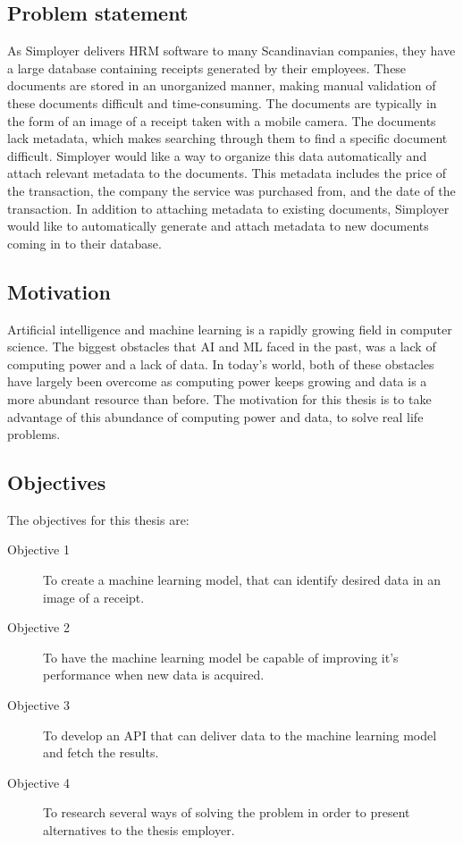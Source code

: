 \subsection{Problem statement}\label{subsec:problem-statement}
As Simployer delivers HRM software to many Scandinavian companies, they have a large database containing receipts
generated by their employees.
These documents are stored in an unorganized manner, making manual validation of these documents difficult and time-consuming.
The documents are typically in the form of an image of a receipt taken with a mobile camera.
The documents lack metadata, which makes searching through them to find a specific document difficult.
Simployer would like a way to organize this data automatically and attach relevant metadata to the documents.
This metadata includes the price of the transaction, the company the service was purchased from, and the date of the transaction.
In addition to attaching metadata to existing documents, Simployer would like to automatically generate and attach metadata to new documents coming in to their database.

\subsection{Motivation}\label{subsec:motivation}
Artificial intelligence and machine learning is a rapidly growing field in computer science.
The biggest obstacles that AI and ML faced in the past, was a lack of computing power and a lack of data.
In today's world, both of these obstacles have largely been overcome as computing power keeps growing and data is a
more abundant resource than before.
The motivation for this thesis is to take advantage of this abundance of computing power and data, to solve real life
problems.

\subsection{Objectives}\label{subsec:objectives}
The objectives for this thesis are:
\begin{description}
    \item[Objective 1] To create a machine learning model, that can identify desired data in an image of a receipt.
    \item[Objective 2] To have the machine learning model be capable of improving it's performance when new data is acquired.
    \item[Objective 3] To develop an API that can deliver data to the machine learning model and fetch the results.
    \item[Objective 4] To research several ways of solving the problem in order to present alternatives to the thesis employer.
\end{description}

